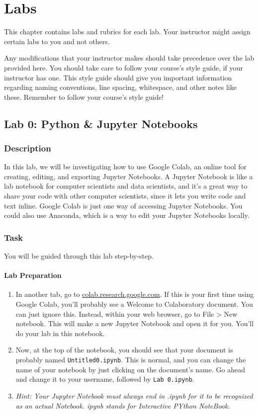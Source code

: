 \chapter*{Labs}
This chapter contains labs and rubrics for each lab. Your instructor might assign certain labs to you and not others.\par
Any modifications that your instructor makes should take precedence over the lab provided here. You should take care to follow your course's style guide, if your instructor has one. This style guide should give you important information regarding naming conventions, line spacing, whitespace, and other notes like these. Remember to follow your course's style guide!

\section*{Lab 0: Python \& Jupyter Notebooks}
\subsection*{Description}
In this lab, we will be investigating how to use Google Colab, an online tool for creating, editing, and exporting Jupyter Notebooks. A Jupyter Notebook is like a lab notebook for computer scientists and data scientists, and it's a great way to share your code with other computer scientists, since it lets you write code and text inline. Google Colab is just one way of accessing Jupyter Notebooks. You could also use Anaconda, which is a way to edit your Jupyter Notebooks locally.
\subsection*{Task}
You will be guided through this lab step-by-step.\par
\subsubsection*{Lab Preparation}
\begin{enumerate}
	\item In another tab, go to \href{https://colab.research.google.com}{colab.research.google.com}. If this is your first time using Google Colab, you'll probably see a Welcome to Colaboratory document. You can just ignore this. Instead, within your web browser, go to File > New notebook. This will make a new Jupyter Notebook and open it for you. You'll do your lab in this notebook.
	\item Now, at the top of the notebook, you should see that your document is probably named \verb|Untitled0.ipynb|. This is normal, and you can change the name of your notebook by just clicking on the document's name. Go ahead and change it to your username, followed by \verb|Lab 0.ipynb|.
	\item \textit{Hint: Your Jupyter Notebook must always end in .ipynb for it to be recognized as an actual Notebook. ipynb stands for Interactive PYthon NoteBook.}
\end{enumerate}

